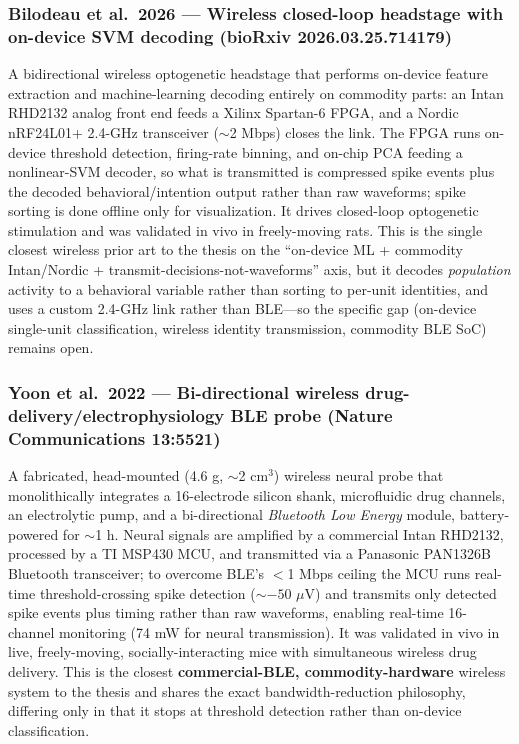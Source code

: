 \documentclass[11pt]{article}
\begin{document}
\subsubsection*{Bilodeau et al.\ 2026 --- Wireless closed-loop headstage with on-device SVM decoding (bioRxiv 2026.03.25.714179)}
A bidirectional wireless optogenetic headstage that performs on-device feature extraction and machine-learning decoding entirely on commodity parts: an Intan RHD2132 analog front end feeds a Xilinx Spartan-6 FPGA, and a Nordic nRF24L01+ 2.4-GHz transceiver ($\sim$2 Mbps) closes the link. The FPGA runs on-device threshold detection, firing-rate binning, and on-chip PCA feeding a nonlinear-SVM decoder, so what is transmitted is compressed spike events plus the decoded behavioral/intention output rather than raw waveforms; spike sorting is done offline only for visualization. It drives closed-loop optogenetic stimulation and was validated in vivo in freely-moving rats. This is the single closest wireless prior art to the thesis on the ``on-device ML + commodity Intan/Nordic + transmit-decisions-not-waveforms'' axis, but it decodes \emph{population} activity to a behavioral variable rather than sorting to per-unit identities, and uses a custom 2.4-GHz link rather than BLE---so the specific gap (on-device single-unit classification, wireless identity transmission, commodity BLE SoC) remains open.

\subsubsection*{Yoon et al.\ 2022 --- Bi-directional wireless drug-delivery/electrophysiology BLE probe (Nature Communications 13:5521)}
A fabricated, head-mounted (4.6 g, $\sim$2 cm$^3$) wireless neural probe that monolithically integrates a 16-electrode silicon shank, microfluidic drug channels, an electrolytic pump, and a bi-directional \emph{Bluetooth Low Energy} module, battery-powered for $\sim$1 h. Neural signals are amplified by a commercial Intan RHD2132, processed by a TI MSP430 MCU, and transmitted via a Panasonic PAN1326B Bluetooth transceiver; to overcome BLE's $<$1 Mbps ceiling the MCU runs real-time threshold-crossing spike detection ($\sim$$-50$ $\mu$V) and transmits only detected spike events plus timing rather than raw waveforms, enabling real-time 16-channel monitoring (74 mW for neural transmission). It was validated in vivo in live, freely-moving, socially-interacting mice with simultaneous wireless drug delivery. This is the closest \textbf{commercial-BLE, commodity-hardware} wireless system to the thesis and shares the exact bandwidth-reduction philosophy, differing only in that it stops at threshold detection rather than on-device classification.
\end{document}
